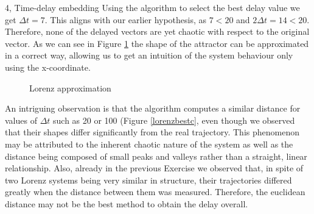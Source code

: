 \begin{task}{4, Time-delay embedding}
Using the algorithm to select the best delay value we get \(\Delta t = 7\). This aligns with our earlier hypothesis, as \(7 < 20\) and \(2\Delta t = 14 < 20\). Therefore, none of the delayed vectors are yet chaotic with respect to the original vector. As we can see in Figure \ref{lorenzbest} the shape of the attractor can be approximated in a correct way, allowing us to get an intuition of the system behaviour only using the x-coordinate.
\begin{figure}[H]
\centering
{}
\caption{Lorenz approximation}
\label{lorenzbest}
\end{figure}
An intriguing observation is that the algorithm computes a similar distance for values of \(\Delta t\) such as 20 or 100 (Figure \ref{lorenzbestc}, even though we observed that their shapes differ significantly from the real trajectory. This phenomenon may be attributed to the inherent chaotic nature of the system as well as the distance being composed of small peaks and valleys rather than a straight, linear relationship. Also, already in the previous Exercise we observed that, in spite of two Lorenz systems being very similar in structure, their trajectories differed greatly when the distance between them was measured. Therefore, the euclidean distance may not be the best method to obtain the delay overall.


\end{task}
